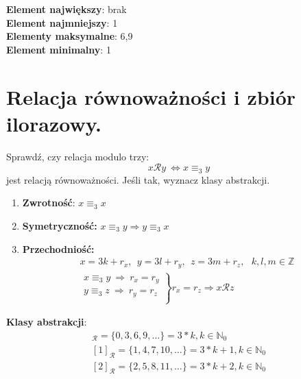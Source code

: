 \documentclass[12pt]{article}
\begin{document}
    \noindent \textbf{Element największy}: brak\\
    \textbf{Element najmniejszy}: 1\\
    \textbf{Elementy maksymalne}: 6,9\\
    \textbf{Element minimalny}: 1\\

    \newpage

    \section{Relacja równoważności i zbiór ilorazowy.}

    \begin{exercise}
        Sprawdź, czy relacja modulo trzy:
        \[ x \mathcal{R} y ~ \Leftrightarrow x \equiv_3 y\]
        jest relacją równoważności. Jeśli tak, wyznacz klasy abstrakcji.
    \end{exercise}

    \begin{enumerate}
        \item \textbf{Zwrotność}: $x \equiv_3 x$
        \item \textbf{Symetryczność:} $x \equiv_3 y \Rightarrow y \equiv_3 x$
        \item \textbf{Przechodniość:}
        \begin{align*}
            x = 3k + r_x, ~~ y = 3l + r_y, ~~ z = 3m + r_z, ~~~ k,l,m \in \mathbb{Z}\\
            \left.\begin{matrix}
                      x \equiv_3 y ~ \Rightarrow ~ r_x = r_y\\
                      y \equiv_3 z ~ \Rightarrow ~ r_y = r_z\\
            \end{matrix}\right\} r_x = r_z \Rightarrow x \mathcal{R} z
        \end{align*}
    \end{enumerate}


    \textbf{Klasy abstrakcji}:
    \begin{gather*}
        [0]_{\mathcal{R}} = \{0, 3, 6, 9, \dots\} = 3*k, k \in \mathbb{N}_0\\
        [1]_{\mathcal{R}} = \{1, 4, 7, 10, \dots\} = 3*k + 1, k \in \mathbb{N}_0\\
        [2]_{\mathcal{R}} = \{2, 5, 8, 11, \dots\} = 3*k + 2, k \in \mathbb{N}_0\\
    \end{gather*}
\end{document}

